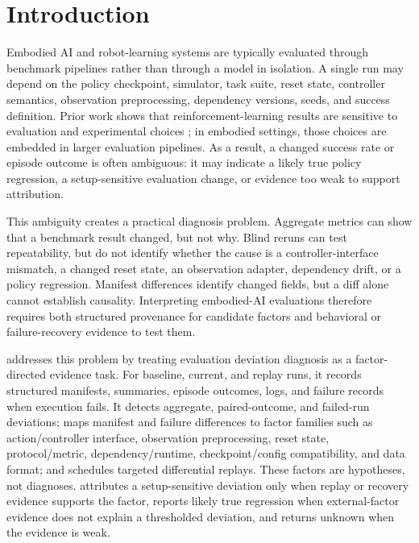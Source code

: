 \section{Introduction}
\label{sec:intro}

Embodied AI and robot-learning systems are typically evaluated through benchmark pipelines rather than through a model in isolation. A single run may depend on the policy checkpoint, simulator, task suite, reset state, controller semantics, observation preprocessing, dependency versions, seeds, and success definition. Prior work shows that reinforcement-learning results are sensitive to evaluation and experimental choices \cite{henderson2018drlmatters}; in embodied settings, those choices are embedded in larger evaluation pipelines. As a result, a changed success rate or episode outcome is often ambiguous: it may indicate a likely true policy regression, a setup-sensitive evaluation change, or evidence too weak to support attribution.

This ambiguity creates a practical diagnosis problem. Aggregate metrics can show that a benchmark result changed, but not why. Blind reruns can test repeatability, but do not identify whether the cause is a controller-interface mismatch, a changed reset state, an observation adapter, dependency drift, or a policy regression. Manifest differences identify changed fields, but a diff alone cannot establish causality. Interpreting embodied-AI evaluations therefore requires both structured provenance for candidate factors and behavioral or failure-recovery evidence to test them.

\sys addresses this problem by treating evaluation deviation diagnosis as a factor-directed evidence task. For baseline, current, and replay runs, it records structured manifests, summaries, episode outcomes, logs, and failure records when execution fails. It detects aggregate, paired-outcome, and failed-run deviations; maps manifest and failure differences to factor families such as action/controller interface, observation preprocessing, reset state, protocol/metric, dependency/runtime, checkpoint/config compatibility, and data format; and schedules targeted differential replays. These factors are hypotheses, not diagnoses. \sys attributes a setup-sensitive deviation only when replay or recovery evidence supports the factor, reports likely true regression when external-factor evidence does not explain a thresholded deviation, and returns unknown when the evidence is weak.

